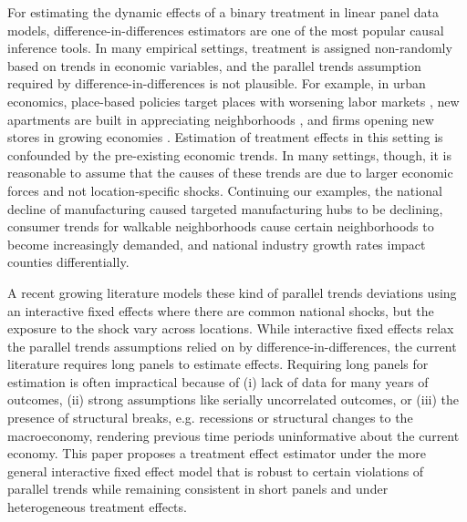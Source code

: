 \documentclass[12pt]{article}
\begin{document}
For estimating the dynamic effects of a binary treatment in linear panel data models, difference-in-differences estimators are one of the most popular causal inference tools. In many empirical settings, treatment is assigned non-randomly based on trends in economic variables, and the parallel trends assumption required by difference-in-differences is not plausible. For example, in urban economics, place-based policies target places with worsening labor markets \citep{neumark2015place}, new apartments are built in appreciating neighborhoods \citep{asquith2021local,pennington2021does}, and firms opening new stores in growing economies \citep{basker2005job,neumark2008effects}. Estimation of treatment effects in this setting is confounded by the pre-existing economic trends. In many settings, though, it is reasonable to assume that the causes of these trends are due to larger economic forces and not location-specific shocks. Continuing our examples, the national decline of manufacturing caused targeted manufacturing hubs to be declining, consumer trends for walkable neighborhoods cause certain neighborhoods to become increasingly demanded, and national industry growth rates impact counties differentially. 

A recent growing literature models these kind of parallel trends deviations using an interactive fixed effects where there are common national shocks, but the exposure to the shock vary across locations. While interactive fixed effects relax the parallel trends assumptions relied on by difference-in-differences, the current literature requires long panels to estimate effects. Requiring long panels for estimation is often impractical because of (i) lack of data for many years of outcomes, (ii) strong assumptions like serially uncorrelated outcomes, or (iii) the presence of structural breaks, e.g. recessions or structural changes to the macroeconomy, rendering previous time periods uninformative about the current economy. This paper proposes a treatment effect estimator under the more general interactive fixed effect model that is robust to certain violations of parallel trends while remaining consistent in short panels and under heterogeneous treatment effects. 
\end{document}
